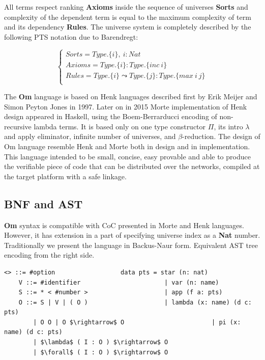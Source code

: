 \documentclass{aip-cp}
\begin{document}
All terms respect ranking {\bf Axioms} inside the sequence of universes {\bf Sorts} and complexity of the dependent term is equal to the maximum complexity of term and its dependency {\bf Rules}.
The universe system is completely described by the following PTS notation due to Barendregt\cite{Henk93}:

$$
\begin{cases}
Sorts = Type.\{i\},\ i : Nat\\
Axioms = Type.\{i\} : Type.\{inc\ i\}\\
Rules = Type.\{i\} \leadsto Type.\{j\} : Type.\{max\ i\ j\}\\
\end{cases}
$$

The {\bf Om} language is based on Henk languages described first by Erik Meijer and Simon Peyton Jones in 1997\cite{Erik97}.
Later on in 2015 Morte implementation of Henk design appeared in Haskell, using the Boem-Berrarducci encoding of non-recursive lambda terms.
It is based only on one type constructor {\bf $\Pi$}, its intro {\bf $\lambda$} and apply eliminator, infinite number of universes, and {\bf $\beta$}-reduction.
The design of Om language resemble Henk and Morte both in design and in implementation.
This language intended to be small, concise, easy provable and able to produce the verifiable piece of code that can be distributed over the networks, compiled at the target platform with a safe linkage.

\subsection{BNF and AST}

{\bf Om} syntax is compatible with CoC presented in Morte and Henk languages.
However, it has extension in a part of specifying universe index as a {\bf Nat} number.
Traditionally we present the language in Backus-Naur form.
Equivalent AST tree encoding from the right side.

\begin{lstlisting}[mathescape=true]
   <> ::= #option                  data pts = star (n: nat)
    V ::= #identifier                       | var (n: name)
    S ::= * < #number >                     | app (f a: pts)
    O ::= S | V | ( O )                     | lambda (x: name) (d c: pts)
        | O O | O $\rightarrow$ O                        | pi (x: name) (d c: pts)
        | $\lambda$ ( I : O ) $\rightarrow$ O
        | $\forall$ ( I : O ) $\rightarrow$ O
\end{lstlisting}
\end{document}
